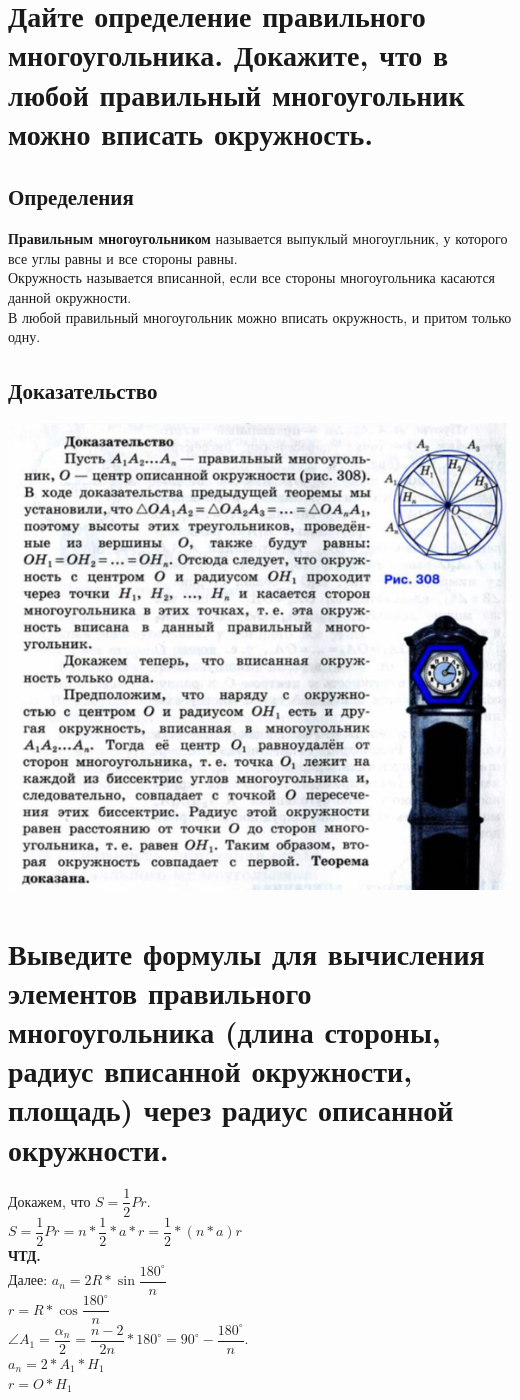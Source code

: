 \documentclass[12pt, letterpaper]{article}
\begin{document}
\section {Дайте определение правильного многоугольника. Докажите, что в любой правильный многоугольник можно вписать окружность.}
\subsection{Определения}
\textbf{Правильным многоугольником} называется выпуклый многоугльник, у которого все углы равны и все стороны равны. \\
Окружность называется вписанной, если все стороны многоугольника касаются данной окружности. \\
В любой правильный многоугольник можно вписать окружность, и притом только одну. \\
\subsection{Доказательство}
\includegraphics[scale=0.3]{photo5.jpg}

\section {Выведите формулы для вычисления элементов правильного многоугольника (длина стороны, радиус вписанной окружности,  площадь) через радиус описанной окружности.}
Докажем, что $S=\dfrac{1}{2}Pr$. \\
$S=\dfrac{1}{2}Pr=n*\dfrac{1}{2}*a*r=\dfrac{1}{2}*(n*a)r$ \\ 
\textbf{ЧТД.} \\
Далее:
$ a_n=2R*\sin \dfrac{180^{\circ}}{n} $ \\
$ r=R*\cos \dfrac{180^{\circ}}{n}$ \\
$ \angle A_1 = \dfrac{\alpha_n}{2}=\dfrac{n-2}{2n}*180^{\circ}=90^{\circ}-\dfrac{180^{\circ}}{n}. $ \\
$ a_n=2*A_1*H_1 $ \\
$ r=O*H_1 $ \\
\end{document}
